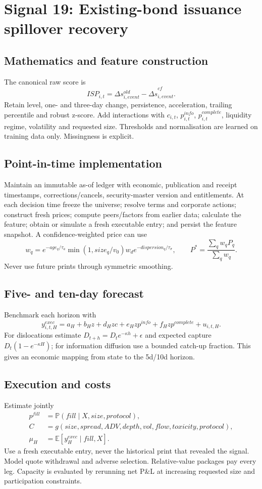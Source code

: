 \documentclass[10pt]{article}
\newcommand{\E}{\mathbb{E}}\newcommand{\Pp}{\mathbb{P}}
\begin{document}
\section{Signal 19: Existing-bond issuance spillover recovery}
\subsection{Mathematics and feature construction}
The canonical raw score is
\begin{equation}ISP_{i,t}=\Delta s^{old}_{i,event}-\widehat{\Delta s}^{cf}_{i,event}.\end{equation}
Retain level, one- and three-day change, persistence, acceleration, trailing percentile and robust z-score. Add interactions with $c_{i,t}$, $p^{info}_{i,t}$, $p^{complete}_{i,t}$, liquidity regime, volatility and requested size. Thresholds and normalisation are learned on training data only. Missingness is explicit.

\subsection{Point-in-time implementation}
Maintain an immutable as-of ledger with economic, publication and receipt timestamps, corrections/cancels, security-master version and entitlements. At each decision time freeze the universe; resolve terms and corporate actions; construct fresh prices; compute peers/factors from earlier data; calculate the feature; obtain or simulate a fresh executable entry; and persist the feature snapshot. A confidence-weighted price can use
\[w_q=e^{-age_q/\tau_a}\min(1,size_q/v_0)w_d e^{-dispersion_q/\tau_\sigma},\qquad P^*=\frac{\sum_qw_qP_q}{\sum_qw_q}.\]
Never use future prints through symmetric smoothing.

\subsection{Five- and ten-day forecast}
Benchmark each horizon with
\[y^{exec}_{i,t,H}=a_H+b_Hz+d_Hzc+e_Hzp^{info}+f_Hzp^{complete}+u_{i,t,H}.\]
For dislocations estimate $D_{t+h}=D_te^{-\kappa h}+\epsilon$ and expected capture $D_t(1-e^{-\kappa H})$; for information diffusion use a bounded catch-up fraction. This gives an economic mapping from state to the 5d/10d horizon.

\subsection{Execution and costs}
Estimate jointly
\begin{align}
p^{fill}&=\Pp(fill\mid X,size,protocol),\\
C&=g(size,spread,ADV,depth,vol,flow,toxicity,protocol),\\
\mu_H&=\E[y^{exec}_H\mid fill,X].
\end{align}
Use a fresh executable entry, never the historical print that revealed the signal. Model quote withdrawal and adverse selection. Relative-value packages pay every leg. Capacity is evaluated by rerunning net P\&L at increasing requested size and participation constraints.
\end{document}
